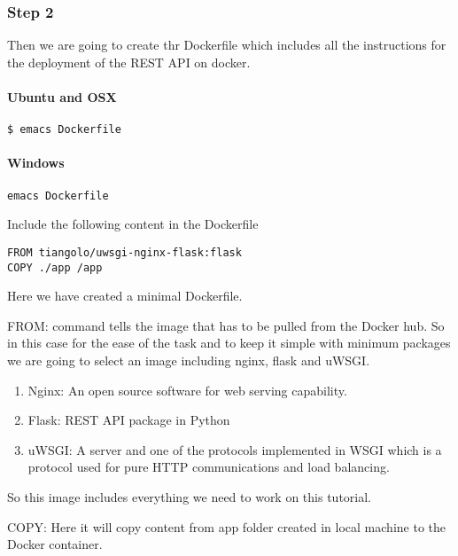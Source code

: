 \subsubsection{Step 2}

Then we are going to create thr Dockerfile which includes all the
instructions for the deployment of the REST API on docker.

\paragraph{Ubuntu and OSX}

\begin{lstlisting}
$ emacs Dockerfile
\end{lstlisting}

\paragraph{Windows}

\begin{lstlisting}
emacs Dockerfile
\end{lstlisting}

Include the following content in the Dockerfile

\begin{lstlisting}
FROM tiangolo/uwsgi-nginx-flask:flask
COPY ./app /app
\end{lstlisting}

Here we have created a minimal Dockerfile.

FROM: command tells the image that has to be pulled from the Docker hub.
So in this case for the ease of the task and to keep it simple with
minimum packages we are going to select an image including nginx, flask
and uWSGI.

\begin{enumerate}
\def\labelenumi{\arabic{enumi}.}
\item
  Nginx: An open source software for web serving capability.
\item
  Flask: REST API package in Python
\item
  uWSGI: A server and one of the protocols implemented in WSGI which is
  a protocol used for pure HTTP communications and load balancing.
\end{enumerate}

So this image includes everything we need to work on this tutorial.

COPY: Here it will copy content from app folder created in local machine
to the Docker container.

